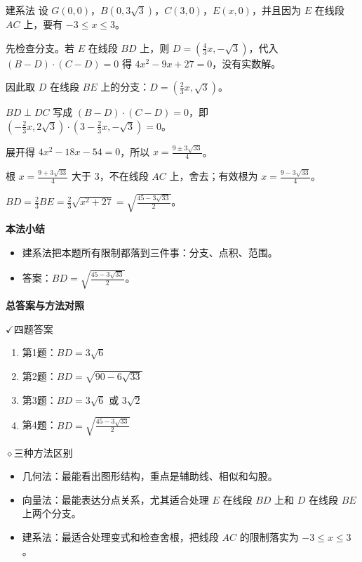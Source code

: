\documentclass{exam-zh}
\newcommand{\eduSectionTitle}[1]{%
  \needspace{5\baselineskip}%
  \vspace{2mm}
  {\color{edu-blue}\bfseries\large #1}\par
  \vspace{3mm}
}
\newcommand{\eduIconCheck}{\(\checkmark\)}
\newcommand{\eduIconPin}{\(\diamond\)}
\newenvironment{eduBulletList}{%
  \begin{itemize}[
    label=\textbullet,
    leftmargin=5mm,
    itemsep=1.2mm,
    topsep=0pt,
    parsep=0pt
  ]
}{%
  \end{itemize}
}
\newenvironment{eduPlainList}{%
  \begin{enumerate}[
    label=(\arabic*),
    leftmargin=7mm,
    itemsep=1.2mm,
    topsep=0pt,
    parsep=0pt
  ]
}{%
  \end{enumerate}
}
\begin{document}
\begin{eduSolutionBox}{建系法}
  \begingroup
  \setlength{\parskip}{2.5mm}
设 $G(0,0)$，$B(0,3\sqrt3)$，$C(3,0)$，$E(x,0)$，并且因为 $E$ 在线段 $AC$ 上，要有 $-3\le x\le3$。\par
先检查分支。若 $E$ 在线段 $BD$ 上，则 $D=(\frac43x,-\sqrt3)$，代入 $(B-D)\cdot(C-D)=0$ 得 $4x^2-9x+27=0$，没有实数解。\par
因此取 $D$ 在线段 $BE$ 上的分支：$D=(\frac23x,\sqrt3)$。\par
$BD\perp DC$ 写成 $(B-D)\cdot(C-D)=0$，即 $(-\frac23x,2\sqrt3)\cdot(3-\frac23x,-\sqrt3)=0$。\par
展开得 $4x^2-18x-54=0$，所以 $x=\frac{9\pm3\sqrt{33}}4$。\par
根 $x=\frac{9+3\sqrt{33}}4$ 大于 $3$，不在线段 $AC$ 上，舍去；有效根为 $x=\frac{9-3\sqrt{33}}4$。\par
$BD=\frac23BE=\frac23\sqrt{x^2+27}=\sqrt{\frac{45-3\sqrt{33}}{2}}$。\par
  \endgroup
  \vspace{2.5mm}
  {\color{edu-blue}\bfseries\small 本法小结}\par\vspace{1.5mm}
  \begin{eduBulletList}
    \item 建系法把本题所有限制都落到三件事：分支、点积、范围。    \item 答案：$BD=\sqrt{\frac{45-3\sqrt{33}}{2}}$。  \end{eduBulletList}
\end{eduSolutionBox}



\clearpage
\eduSectionTitle{总答案与方法对照}

\begin{eduSummaryBlock}{\eduIconCheck}{四题答案}
\begin{eduPlainList}
  \item 第1题：$BD=3\sqrt6$  \item 第2题：$BD=\sqrt{90-6\sqrt{33}}$  \item 第3题：$BD=3\sqrt6$ 或 $3\sqrt2$  \item 第4题：$BD=\sqrt{\frac{45-3\sqrt{33}}{2}}$\end{eduPlainList}
\end{eduSummaryBlock}




\begin{eduSummaryBlock}{\eduIconPin}{三种方法区别}
\begin{eduBulletList}
  \item 几何法：最能看出图形结构，重点是辅助线、相似和勾股。  \item 向量法：最能表达分点关系，尤其适合处理 $E$ 在线段 $BD$ 上和 $D$ 在线段 $BE$ 上两个分支。  \item 建系法：最适合处理变式和检查舍根，把线段 $AC$ 的限制落实为 $-3\le x\le3$。\end{eduBulletList}
\end{eduSummaryBlock}
\end{document}
